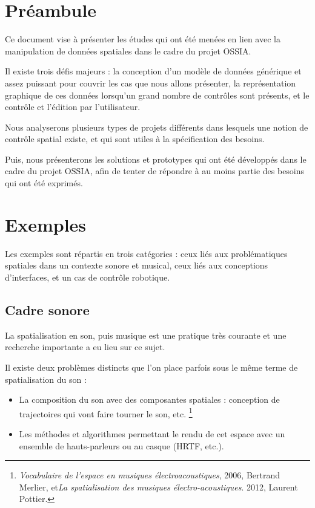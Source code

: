 \documentclass[french]{article}
\begin{document}
\section{Préambule}
Ce document vise à présenter les études qui ont été menées en lien avec 
la manipulation de données spatiales dans le cadre du projet OSSIA.

Il existe trois défis majeurs : la conception d'un modèle de données générique et assez puissant pour couvrir les cas que nous allons présenter, la représentation graphique de ces données lorsqu'un grand nombre de contrôles sont présents, et le contrôle et l'édition par l'utilisateur.

Nous analyserons plusieurs types de projets différents dans lesquels une notion
de contrôle spatial existe, et qui sont utiles à la spécification des besoins.

Puis, nous présenterons les solutions et prototypes qui ont été développés dans le cadre du projet OSSIA, afin de tenter de répondre à au moins partie des besoins qui ont été exprimés.

\section{Exemples}
Les exemples sont répartis en trois catégories : ceux liés aux problématiques spatiales dans un contexte sonore et musical, ceux liés aux conceptions d'interfaces, et un cas de contrôle robotique.

\subsection{Cadre sonore}
La spatialisation en son, puis musique est une pratique très courante et une recherche importante a eu lieu sur ce sujet.

Il existe deux problèmes distincts que l'on place parfois sous le même terme de spatialisation du son : 
\begin{itemize}
\item La composition du son avec des composantes spatiales : conception de trajectoires qui vont faire tourner le son, etc. \footnote{\textit{Vocabulaire de l'espace en musiques électroacoustiques}, 2006, Bertrand Merlier, et\textit{La spatialisation des musiques électro-acoustiques}. 2012, Laurent Pottier.}
\item Les méthodes et algorithmes permettant le rendu de cet espace avec un ensemble de hauts-parleurs ou au casque (HRTF, etc.).
\end{itemize}
\end{document}
